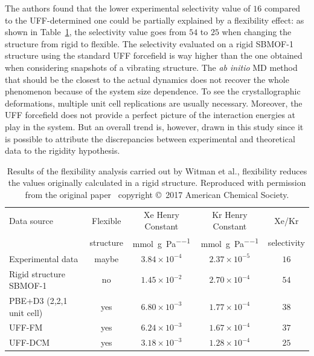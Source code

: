 \documentclass[main]{subfiles}
\begin{document}
The authors found that the lower experimental selectivity value of $16$ compared to the UFF-determined one could be partially explained by a flexibility effect: as shown in Table~\ref{table:witman_sbmof}, the selectivity value goes from $54$ to $25$ when changing the structure from rigid to flexible. The selectivity evaluated on a rigid SBMOF-1 structure using the standard UFF forcefield is way higher than the one obtained when considering snapshots of a vibrating structure. The \emph{ab initio} MD method that should be the closest to the actual dynamics does not recover the whole phenomenon because of the system size dependence. To see the crystallographic deformations, multiple unit cell replications are usually necessary. Moreover, the UFF forcefield does not provide a perfect picture of the interaction energies at play in the system. But an overall trend is, however, drawn in this study since it is possible to attribute the discrepancies between experimental and theoretical data to the rigidity hypothesis.

\begin{table}[t]
  \centering
  \small
  \begin{tabular}{|l|c|c|c|c|}
  \hline
    Data source & Flexible &  Xe Henry Constant &  Kr Henry Constant &  Xe/Kr \\
      & structure &  \si{\mmol\per\g\per\Pa} &  \si{\mmol\per\g\per\Pa} &  selectivity \\
  \hline
    Experimental data\autocite{Banerjee_2016} & maybe &  $3.84\times 10^{-4}$ &  $2.37\times 10^{-5}$ &  $16$ \\
  \hline
    Rigid structure SBMOF-1\autocite{Banerjee_2016} & no &  $1.45\times 10^{-2}$ &  $2.70\times 10^{-4}$ &  $54$ \\
    PBE+D3 (2,2,1 unit cell) & yes &  $6.80\times 10^{-3}$ &  $1.77\times 10^{-4}$ &  $38$ \\
    UFF-FM & yes &  $6.24\times 10^{-3}$ &  $1.67\times 10^{-4}$ &  $37$ \\
    UFF-DCM & yes &  $3.18\times 10^{-3}$ &  $1.28\times 10^{-4}$ &  $25$ \\
  \hline
\end{tabular}
\caption{ Results of the flexibility analysis carried out by Witman et al., flexibility reduces the values originally calculated in a rigid structure. Reproduced with permission from the original paper~\cite{Witman_2017} copyright \copyright\ 2017 American Chemical Society.}\label{table:witman_sbmof}
\end{table}
\end{document}
